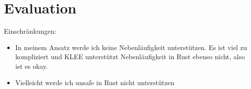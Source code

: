\documentclass{article}
\begin{document}
\section{Evaluation}
Einschränkungen:
\begin{itemize}
    \item In meinem Ansatz werde ich keine Nebenläufigkeit unterstützen. Es ist viel zu kompliziert und KLEE unterstützt Nebenläufigkeit in Rust ebenso nicht, also ist es okay. 
    \item Vielleicht werde ich unsafe in Rust nicht unterstützen
\end{itemize}


\appendix




\end{document}
